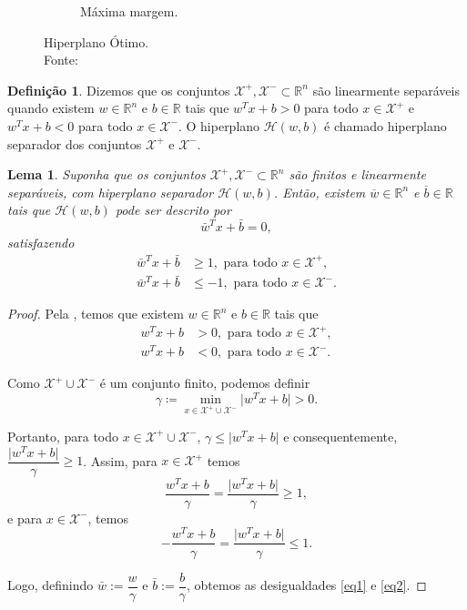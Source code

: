 \documentclass[12pt,a4paper]{scrartcl}
\def\Xset{\mathcal{X}}
\def\Hset{\mathcal{H}}
\def\RR{\mathds{R}}
\def\wbar{\bar{w}}
\def\bbar{\bar{b}}
\newtheorem{lema}{Lema}
\theoremstyle{definition}%
\newtheorem{defi}{Definição}
\begin{document}
\begin{figure}[hbtp]
\begin{subfigure}[h]{0.38\textwidth}
		\caption{Máxima margem. \label{fig3:b}}	
	\end{subfigure}
\caption{Hiperplano Ótimo. \label{fig3}
\\ Fonte: \textcite{Evelin2017}}
\end{figure}

\begin{defi} \label{def1} Dizemos que os conjuntos $\Xset^{+}, \Xset^{-} \subset \RR^n$ são linearmente separáveis quando existem $w\in \RR^n$ e $b\in \RR$  tais que $w^{T}x+b>0$ para todo $x\in \Xset^{+}$ e $w^{T}x+b<0$ para todo $x\in \Xset^{-}$. O hiperplano $\Hset(w,b)$ é chamado hiperplano separador dos conjuntos $\Xset^{+}$ e $\Xset^{-}$.
\end{defi}

\begin{lema} Suponha que os conjuntos $\Xset^{+}, \Xset^{-} \subset \RR^n$ são finitos e linearmente separáveis, com hiperplano separador $\Hset(w,b)$. Então, existem $\overline{w}\in \RR^n$ e $\overline{b}\in \RR$ tais que $\Hset(w,b)$ pode ser descrito por
\[
\wbar^{T}x+\bbar =0,
\]
satisfazendo
\begin{align}
\wbar^{T}x+\bbar &\geq 1, \text{ para todo } x\in \Xset^{+}, \label{eq1} \\
\wbar^{T}x+\bbar &\leq -1, \text{ para todo } x\in \Xset^{-}. \label{eq2}
\end{align}
\end{lema} 

\begin{proof}
Pela  , temos que existem $w\in \RR^n$ e $b\in \RR$ tais que
\begin{align}
w^{T}x+b &>0, \text{ para todo } x\in \Xset^{+}, \\
w^{T}x+b &<0, \text{ para todo } x\in \Xset^{-}.
\end{align}  

Como $\Xset^{+}\cup \Xset^{-}$ é um conjunto finito, podemos definir
\[ \gamma \coloneqq \min_{x\in \Xset^{+}\cup \Xset^{-}} \vert w^{T}x+b\vert  >0. \]

Portanto, para todo $x\in \Xset^{+}\cup \Xset^{-}$, $\gamma \leq \vert w^{T}x+b\vert$ e consequentemente, $\dfrac{\vert w^{T}x+b\vert }{\gamma} \geq 1$. Assim, para $x\in \Xset^{+}$ temos
\[ \dfrac{w^{T}x+b}{\gamma} = \dfrac{\vert w^{T}x+b\vert }{\gamma} \geq 1, \]
e para $x\in \Xset^{-}$, temos
\[- \dfrac{w^{T}x+b}{\gamma} = \dfrac{\vert w^{T}x+b\vert }{\gamma} \leq 1. \]

Logo, definindo $\wbar:=\dfrac{w}{\gamma}$ e $\bbar :=\dfrac{b}{\gamma}$, obtemos as desigualdades \eqref{eq1} e \eqref{eq2}. 

\end{proof}
\end{document}
